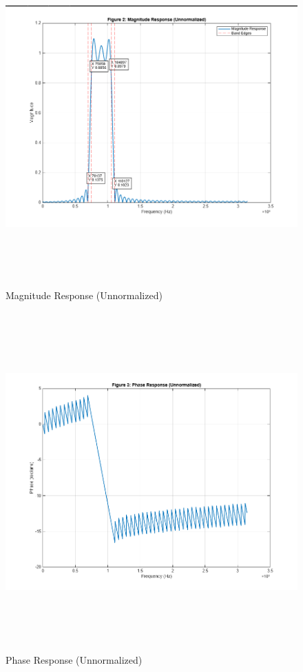 \documentclass[12pt]{article}
\begin{document}
\begin{figure}[H]
    \centering
    \includegraphics[height=13cm]{g18.png}
    \caption{Magnitude Response (Unnormalized)}
    \label{fig:mag_response}
\end{figure}

\begin{figure}[H]
    \centering
    \includegraphics[height=13cm]{g13.png}
    \caption{Phase Response (Unnormalized)}
    \label{fig:phase_response}
\end{figure}
\end{document}
